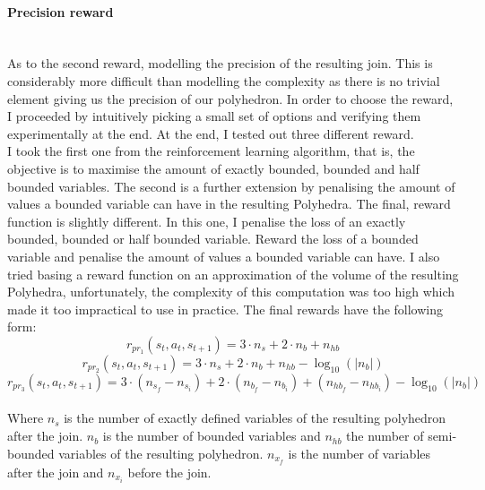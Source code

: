 \paragraph{Precision reward}\mbox{}\\
As to the second reward, modelling the precision of the resulting join. This is considerably more difficult than modelling the complexity as there is no trivial element giving us the precision of our polyhedron. In order to choose the reward, I proceeded by intuitively picking a small set of options and verifying them experimentally at the end. At the end, I tested out three different reward.\\
I took the first one from the reinforcement learning algorithm, that is, the objective is to maximise the amount of exactly bounded, bounded and half bounded variables. The second is a further extension by penalising the amount of values a bounded variable can have in the resulting Polyhedra. The final, reward function is slightly different. In this one, I penalise the loss of an exactly bounded, bounded or half bounded variable. Reward the loss of a bounded variable and penalise the amount of values a bounded variable can have. I also tried basing a reward function on an approximation of the volume of the resulting Polyhedra, unfortunately, the complexity of this computation was too high which made it too impractical to use in practice. The final rewards have the following form:
\begin{equation}
		r_{pr_1}(s_t,a_t,s_{t+1}) = 3  \cdot n_s + 2 \cdot n_b + n_{hb}
\end{equation}
\begin{equation}
		r_{pr_2}(s_t,a_t,s_{t+1}) = 3  \cdot n_s + 2 \cdot n_b + n_{hb} - \log_{10}(|n_b|)
\end{equation}
\begin{equation}
		r_{pr_3}(s_t,a_t,s_{t+1}) = 3  \cdot (n_{s_f} - n_{s_i}) + 2 \cdot (n_{b_f} - n_{b_i}) + (n_{hb_f} - n_{hb_i}) - \log_{10}(|n_b|)
\end{equation}\mbox{}\\
Where $n_s$ is the number of exactly defined variables of the resulting polyhedron after the join. $n_b$ is the number of bounded variables and $n_{hb}$ the number of semi-bounded variables of the resulting polyhedron. $n_{x_f}$ is the number of variables after the join and $n_{x_i}$ before the join.
